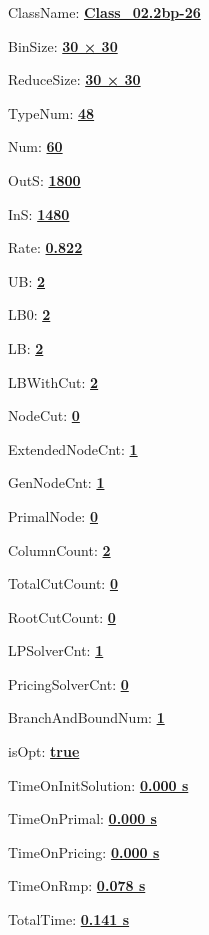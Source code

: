 \documentclass[11pt]{article}
\begin{document}
\pagestyle{empty}


ClassName: \underline{\textbf{Class_02.2bp-26}}
\par
BinSize: \underline{\textbf{30 × 30}}
\par
ReduceSize: \underline{\textbf{30 × 30}}
\par
TypeNum: \underline{\textbf{48}}
\par
Num: \underline{\textbf{60}}
\par
OutS: \underline{\textbf{1800}}
\par
InS: \underline{\textbf{1480}}
\par
Rate: \underline{\textbf{0.822}}
\par
UB: \underline{\textbf{2}}
\par
LB0: \underline{\textbf{2}}
\par
LB: \underline{\textbf{2}}
\par
LBWithCut: \underline{\textbf{2}}
\par
NodeCut: \underline{\textbf{0}}
\par
ExtendedNodeCnt: \underline{\textbf{1}}
\par
GenNodeCnt: \underline{\textbf{1}}
\par
PrimalNode: \underline{\textbf{0}}
\par
ColumnCount: \underline{\textbf{2}}
\par
TotalCutCount: \underline{\textbf{0}}
\par
RootCutCount: \underline{\textbf{0}}
\par
LPSolverCnt: \underline{\textbf{1}}
\par
PricingSolverCnt: \underline{\textbf{0}}
\par
BranchAndBoundNum: \underline{\textbf{1}}
\par
isOpt: \underline{\textbf{true}}
\par
TimeOnInitSolution: \underline{\textbf{0.000 s}}
\par
TimeOnPrimal: \underline{\textbf{0.000 s}}
\par
TimeOnPricing: \underline{\textbf{0.000 s}}
\par
TimeOnRmp: \underline{\textbf{0.078 s}}
\par
TotalTime: \underline{\textbf{0.141 s}}
\par
\newpage
\end{document}
